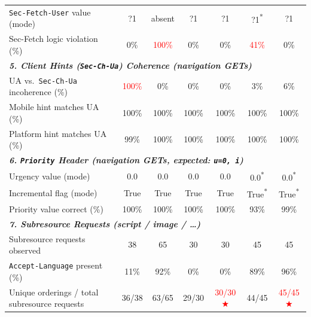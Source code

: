 \begin{table}[htbp]
{\begin{tabular}{lcccccc}
      \texttt{Sec-Fetch-User} value (mode) & ?1 & absent & ?1 & ?1 & ?1\textsuperscript{*} & ?1 \\
      Sec-Fetch logic violation (\%) & 0\% & \textcolor{red}{100\%} & 0\% & 0\% & \textcolor{red}{41\%} & 0\% \\
      \midrule
      \multicolumn{7}{l}{\small\textit{\textbf{5. Client Hints (\texttt{Sec-Ch-Ua}) Coherence  (navigation GETs)}}} \\
      \midrule[0.3pt]
      UA vs.\ \texttt{Sec-Ch-Ua} incoherence (\%) & \textcolor{red}{100\%} & 0\% & 0\% & 0\% & 3\% & 6\% \\
      Mobile hint matches UA (\%) & 100\% & 100\% & 100\% & 100\% & 100\% & 100\% \\
      Platform hint matches UA (\%) & 99\% & 100\% & 100\% & 100\% & 100\% & 100\% \\
      \midrule
      \multicolumn{7}{l}{\small\textit{\textbf{6. \texttt{Priority} Header  (navigation GETs, expected: \texttt{u=0, i})}}} \\
      \midrule[0.3pt]
      Urgency value (mode) & 0.0 & 0.0 & 0.0 & 0.0 & 0.0\textsuperscript{*} & 0.0\textsuperscript{*} \\
      Incremental flag (mode) & True & True & True & True & True\textsuperscript{*} & True\textsuperscript{*} \\
      Priority value correct (\%) & 100\% & 100\% & 100\% & 100\% & 93\% & 99\% \\
      \midrule
      \multicolumn{7}{l}{\small\textit{\textbf{7. Subresource Requests  (script / image / …)}}} \\
      \midrule[0.3pt]
      Subresource requests observed & 38 & 65 & 30 & 30 & 45 & 45 \\
      \texttt{Accept-Language} present (\%) & 11\% & 92\% & 0\% & 0\% & 89\% & 96\% \\
      Unique orderings / total subresource requests & 36/38 & 63/65 & 29/30 & \textcolor{red}{30/30 $\bigstar$} & 44/45 & \textcolor{red}{45/45 $\bigstar$} \\
      \bottomrule
    \end{tabular}%
  }
\end{table}